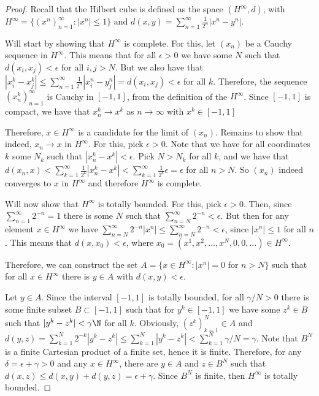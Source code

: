 \begin{proof}

Recall that the Hilbert cube is defined as the space $(H^\infty, d)$, with $H^\infty = \{(x^n)_{n=1}^\infty: |x^n| \leq 1\}$ and $d(x,y) = \sum_{n=1}^\infty \frac{1}{2^n} |x^n - y^n|$.

Will start by showing that $H^\infty$ is complete. For this, let $(x_n)$ be a Cauchy sequence in $H^\infty$. This means that for all $\epsilon > 0$ we have some $N$ such that $d(x_i, x_j) < \epsilon$ for all $i, j > N$. But we also have that $|x_i^k - x_j^k| \leq \sum_{n=1}^\infty \frac{1}{2^n} |x_i^n - y_j^n| = d(x_i, x_j) < \epsilon$ for all $k$. Therefore, the sequence $(x_n^k)_{n=1}^\infty$ is Cauchy in $[-1,1]$, from the definition of the $H^\infty$. Since $[-1,1]$ is compact, we have that $x_n^k \rightarrow x^k$ as $n\rightarrow \infty$ with $x^k \in [-1,1]$

Therefore, $x \in H^\infty$ is a candidate for the limit of $(x_n)$. Remains to show that indeed, $x_n \rightarrow x$ in $H^\infty$. For this, pick $\epsilon > 0$. Note that we have for all coordinates $k$ some $N_k$ such that $|x_n^k - x^k| < \epsilon$. Pick $N > N_k$ for all $k$, and we have that $d(x_n, x) < \sum_{k=1}^\infty \frac{1}{2^k} |x_n^k - x^k| < \sum_{k=1}^\infty \frac{1}{2^k} \epsilon = \epsilon$ for all $n > N$. So $(x_n)$ indeed converges to $x$ in $H^\infty$ and therefore $H^\infty$ is complete.

\vspace{1em}

Will now show that $H^\infty$ is totally bounded. For this, pick $\epsilon > 0$. Then, since $\sum_{n=1}^\infty 2^{-n} = 1$ there is some $N$ such that $\sum_{n=N}^\infty 2^{-n} < \epsilon$. But then for any element $x \in H^\infty$ we have $\sum_{n=N}^\infty 2^{-n} |x^n| \leq \sum_{n=N}^\infty 2^{-n} < \epsilon$, since $|x^n| \leq 1$ for all $n$. This means that $d(x, x_0) < \epsilon$, where $x_0 = (x^1, x^2, \dots, x^N, 0, 0, \dots) \in H^\infty$.

Therefore, we can construct the set $A = \{x \in H^\infty : |x^n| = 0$ for $n > N\}$ such that for all $x \in H^\infty$ there is $y \in A$ with $d(x,y) < \epsilon$.

\vspace{1em}

Let $y \in A$. Since the interval $[-1,1]$ is totally bounded, for all $\gamma/N > 0$ there is some finite subset $B \subset [-1,1]$ such that for $y^k \in [-1,1]$ we have some $z^k \in B$ such that $|y^k-z^k|<\gamma\N$ for all $k$. Obviously, $(z^k)_{k=1}^N \in A$ and $d(y,z) = \sum_{k=1}^N 2^{-k} |y^k - z^k| \leq \sum_{k=1}^N |y^k - z^k| < \sum_{k=1}^N \gamma/N = \gamma$. Note that $B^N$ is a finite Cartesian product of a finite set, hence it is finite. Therefore, for any $\delta = \epsilon + \gamma > 0$ and any $x\in H^\infty$, there are $y \in A$ and $z \in B^N$ such that $d(x, z) \leq d(x,y) + d(y,z) = \epsilon + \gamma$. Since $B^N$ is finite, then $H^\infty$ is totally bounded.


\end{proof}
